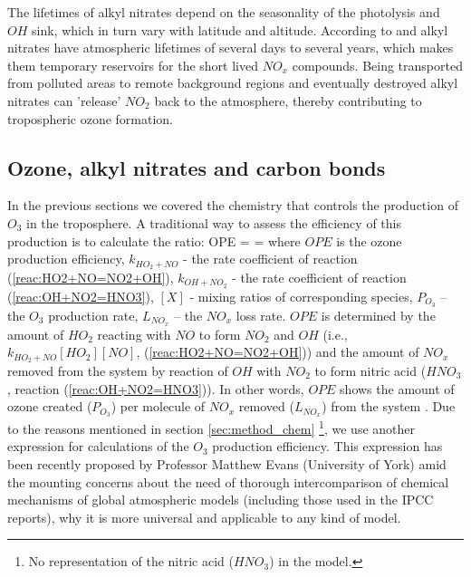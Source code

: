 \documentclass[11pt,a4paper]{article}
\newcounter{matriz}
\newenvironment{matriz}{\refstepcounter{matriz}\equation}{\tag{\thematriz}\endequation}
\begin{document}
The lifetimes of alkyl nitrates depend on the seasonality of the photolysis and $OH$ sink, which in turn vary with latitude and altitude. According to \cite{Clemitshaw1997} and \cite{Turberg1990} alkyl nitrates have atmospheric lifetimes of several days to several years, which makes them temporary reservoirs for the short lived $NO_x$ compounds. Being transported from polluted areas to remote background regions and eventually destroyed alkyl nitrates can 'release' $NO_2$ back to the atmosphere, thereby contributing to tropospheric ozone formation.

\subsection{Ozone, alkyl nitrates and carbon bonds} \label{sec:intro_CB}
In the previous sections we covered the chemistry that controls the production of $O_3$ in the troposphere. A traditional way to assess the efficiency of this production is to calculate the ratio:
\begin{matriz} \label{eq:OPE}
OPE =  = 
\end{matriz}
where $OPE$ is the ozone production efficiency, $k_{HO_2+NO}$ - the rate coefficient of reaction (\ref{reac:HO2+NO=NO2+OH}), $k_{OH+NO_2}$ - the rate coefficient of reaction (\ref{reac:OH+NO2=HNO3}), $[X]$ - mixing ratios of corresponding species, $P_{O_3}$ – the $O_3$ production rate, $L_{NO_x}$ – the $NO_x$ loss rate. $OPE$ is determined by the amount of $HO_2$ reacting with $NO$ to form $NO_2$ and $OH$ (i.e., $k_{HO_2+NO}[HO_2][NO]$, (\ref{reac:HO2+NO=NO2+OH})) and the amount of $NO_x$ removed from the system by reaction of $OH$ with $NO_2$ to form nitric acid ($HNO_3$, reaction (\ref{reac:OH+NO2=HNO3})). In other words, $OPE$ shows the amount of ozone created ($P_{O_3}$) per molecule of $NO_x$ removed ($L_{NO_x}$) from the system \citep{Jacob1999}. Due to the reasons mentioned in section \ref{sec:method_chem} \footnote{No representation of the nitric acid ($HNO_3$) in the model.}, we use another expression for calculations of the $O_3$ production efficiency. This expression has been recently proposed by Professor Matthew Evans (University of York) amid the mounting concerns about the need of thorough intercomparison of chemical mechanisms of global atmospheric models (including those used in the IPCC reports), why it is more universal and applicable to any kind of model.
\end{document}
